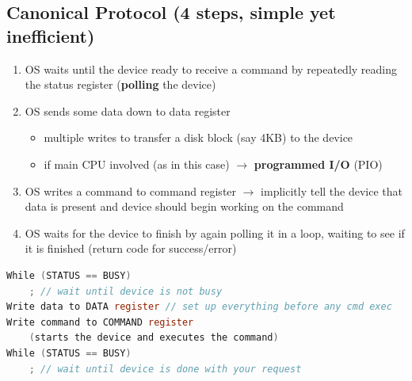 \documentclass[8pt,a4paper,landscape]{extarticle}
\begin{document}
\begin{multicols*}{3}
\section*{Canonical Protocol (4 steps, simple yet inefficient)}
\begin{enumerate}
\item OS waits until the device ready to receive a command by repeatedly reading the status register (\textbf{polling} the device)
\item OS sends some data down to data register
  \begin{itemize}
  \item multiple writes to transfer a disk block (say 4KB) to the device
  \item if main CPU involved (as in this case) $\to$ \textbf{programmed I/O} (PIO)
  \end{itemize}
\item OS writes a command to command register $\to$ implicitly tell the device that data is present and device should begin working on the command
\item OS waits for the device to finish by again polling it in a loop, waiting to see if it is finished (return code for success/error)
\end{enumerate}
\begin{lstlisting}[language=c]
While (STATUS == BUSY)
    ; // wait until device is not busy
Write data to DATA register // set up everything before any cmd exec
Write command to COMMAND register
    (starts the device and executes the command)
While (STATUS == BUSY)
    ; // wait until device is done with your request
\end{lstlisting}

\end{multicols*}
\end{document}
